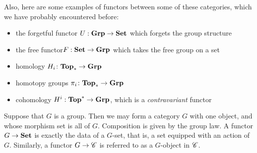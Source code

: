 \documentclass{article}[11pt]
\begin{document}
Also, here are some examples of functors between some of these categories, which we have probably encountered before:
\begin{itemize}\itemsep0em 
	\item the {forgetful functor}  $U: \textbf{Grp} \to \textbf{Set}$ which forgets the group structure
	\item  the {free functor}$F:\textbf{Set} \to \textbf{Grp}$  which takes the free group on a set
	\item  homology $H_i \colon \textbf{Top}_\ast \to \textbf{Grp}$ 
	\item  homotopy groups $\pi_i \colon \textbf{Top}_\ast \to \textbf{Grp}$ 
	\item cohomology $H^i : \textbf{Top}^\ast \to \textbf{Grp}$, which is a \textit{contravariant} functor
\end{itemize}



\begin{example} Suppose that $G$ is a group. Then we may form a category $G$ with one object, and whose morphism set is all of $G$. Composition is given by the group law. A functor $G \to \textbf{Set}$ is exactly the data of a $G$-set, that is, a set equipped with an action of $G$. Similarly, a functor $G \to \mathscr{C}$ is referred to as a $G$-object in $\mathscr{C}$.
\end{example}
\end{document}
